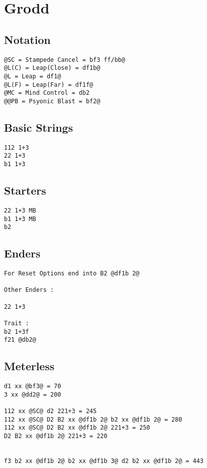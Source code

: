 \documentclass[main.tex]{subfiles}
\begin{document}
\chapter{Grodd}

\section{Notation}
\begin{lstlisting}[language=FG]
@SC = Stampede Cancel = bf3 ff/bb@
@L(C) = Leap(Close) = df1b@
@L = Leap = df1@
@L(F) = Leap(Far) = df1f@
@MC = Mind Control = db2
@@PB = Psyonic Blast = bf2@
\end{lstlisting}


\section{Basic Strings}

\begin{lstlisting}[language=FG]
112 1+3
22 1+3
b1 1+3
\end{lstlisting}

\section{Starters}
\begin{lstlisting}[language=FG]
22 1+3 MB
b1 1+3 MB
b2

\end{lstlisting}

\section{Enders}

\begin{lstlisting}[language=FG]
For Reset Options end into B2 @df1b 2@ 

Other Enders :

22 1+3

Trait :
b2 1+3f
f21 @db2@
\end{lstlisting}

\section{Meterless}


\begin{lstlisting}[language=FG]
d1 xx @bf3@ = 70
3 xx @dd2@ = 200

112 xx @SC@ d2 221+3 = 245
112 xx @SC@ D2 B2 xx @df1b 2@ b2 xx @df1b 2@ = 280
112 xx @SC@ D2 B2 xx @df1b 2@ 221+3 = 250
D2 B2 xx @df1b 2@ 221+3 = 220


f3 b2 xx @df1b 2@ b2 xx @df1b 3@ d2 b2 xx @df1b 2@ = 443
\end{lstlisting}
\end{document}
